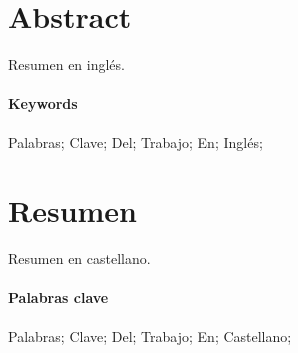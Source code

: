
\thispagestyle{empty}
\section*{Abstract}

Resumen en inglés.

\paragraph*{Keywords}

Palabras; Clave; Del; Trabajo; En; Inglés;

\section*{Resumen}

Resumen en castellano.

\paragraph*{Palabras clave}

Palabras; Clave; Del; Trabajo; En; Castellano;